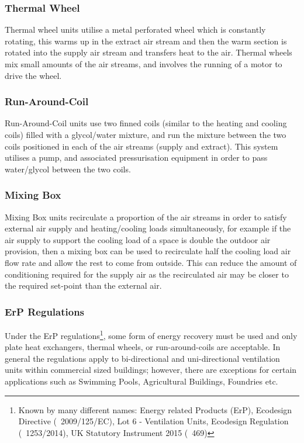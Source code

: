 \subsubsection{Thermal Wheel}

Thermal wheel units utilise a metal perforated wheel which is constantly rotating, this warms up in the extract air stream and then the warm section is rotated into the supply air stream and transfers heat to the air.  Thermal wheels mix small amounts of the air streams, and involves the running of a motor to drive the wheel.

\subsubsection{Run-Around-Coil}

Run-Around-Coil units use two finned coils (similar to the heating and cooling coils) filled with a glycol/water mixture, and run the mixture between the two coils positioned in each of the air streams (supply and extract).  This system utilises a pump, and associated pressurisation equipment in order to pass water/glycol between the two coils.

\subsubsection{Mixing Box}

Mixing Box units recirculate a proportion of the air streams in order to satisfy external air supply and heating/cooling loads simultaneously, for example if the air supply to support the cooling load of a space is double the outdoor air provision, then a mixing box can be used to recirculate half the cooling load air flow rate and allow the rest to come from outside.  This can reduce the amount of conditioning required for the supply air as the recirculated air may be closer to the required set-point than the external air.

\subsubsection{ErP Regulations}

Under the ErP regulations\footnote{Known by many different names: Energy related Products (ErP), Ecodesign Directive (\textnumero~2009/125/EC), Lot 6 - Ventilation Units, Ecodesign Regulation (\textnumero~1253/2014), UK Statutory Instrument 2015 (\textnumero~469)}, some form of energy recovery must be used and only plate heat exchangers, thermal wheels, or run-around-coils are acceptable.  In general the regulations apply to bi-directional and uni-directional ventilation units within commercial sized buildings; however, there are exceptions for certain applications such as Swimming Pools, Agricultural Buildings, Foundries etc.


